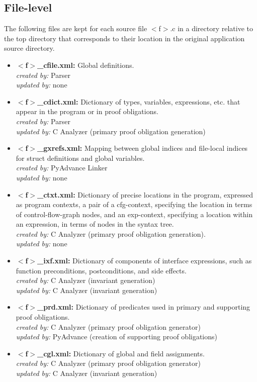 \documentclass[11pt]{article}
\newcommand\fname{$<$f$>$}
\begin{document}
\subsection{File-level}

The following files are kept for each source file \fname.c in a directory relative
to the top directory that corresponds to their location in the original application
source directory.
\begin{itemize}[leftmargin=*]
\item {\bf \fname\_cfile.xml: } Global definitions.\\
   \emph{created by:} Parser \\
   \emph{updated by:} none
\item {\bf \fname\_cdict.xml: } Dictionary of types, variables, expressions, etc.
   that appear in the program or in  proof obligations.\\
   \emph{created by:} Parser \\
   \emph{updated by:} C Analyzer (primary proof obligation generation)
\item {\bf \fname\_gxrefs.xml: } Mapping between global indices and file-local
   indices for struct definitions and global variables. \\
   \emph{created by:} PyAdvance Linker \\
   \emph{updated by:} none
\item {\bf \fname\_ctxt.xml:} Dictionary of precise locations in the program,
   expressed as program contexts, a pair of a cfg-context, specifying the location
   in terms of control-flow-graph nodes, and an exp-context, specifying a location
   within an expression, in terms of nodes in the syntax tree. \\
   \emph{created by:} C Analyzer (primary proof obligation generation). \\
   \emph{updated by:} none
\item {\bf \fname\_ixf.xml:} Dictionary of components of interface expressions,
   such as function preconditions, postconditions, and side effects.\\
   \emph{created by:} C Analyzer (invariant generation) \\
   \emph{updated by:} C Analyzer (invariant generation)
\item {\bf \fname\_prd.xml:} Dictionary of predicates used in primary and supporting
   proof obligations.\\
   \emph{created by:} C Analyzer (primary proof obligation generator) \\
   \emph{updated by:} PyAdvance (creation of supporting proof obligations)
\item {\bf \fname\_cgl.xml:} Dictionary of global and field assignments.\\
	\emph{created by:} C Analyzer (primary proof obligation generator) \\
	\emph{updated by:} C Analyzer (invariant generation)
\end{itemize}
\end{document}

